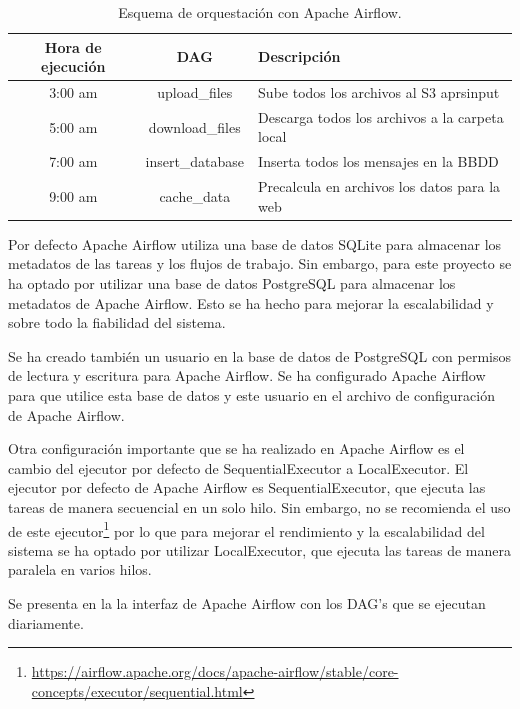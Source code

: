 \begin{table}[htbp]
	\centering
	\begin{tabular}{|c|c|m{5.5cm}|}
		\hline
		\textbf{Hora de ejecución} & \textbf{DAG}     & \textbf{Descripción}                           \\
		\hline
		3:00 am                    & upload\_files    & Sube todos los archivos al S3 aprsinput        \\
		\hline
		5:00 am                    & download\_files  & Descarga todos los archivos a la carpeta local \\
		\hline
		7:00 am                    & insert\_database & Inserta todos los mensajes en la BBDD          \\
		\hline
		9:00 am                    & cache\_data      & Precalcula en archivos los datos para la web   \\
		\hline
	\end{tabular}
	\caption{Esquema de orquestación con Apache Airflow.}
	\label{tab:airflow-sched}
\end{table}

Por defecto Apache Airflow utiliza una base de datos SQLite para almacenar los metadatos de las tareas y los flujos de trabajo. Sin embargo, para este proyecto se ha optado por utilizar una base de datos PostgreSQL para almacenar los metadatos de Apache Airflow. Esto se ha hecho para mejorar la escalabilidad y sobre todo la fiabilidad del sistema.

Se ha creado también un usuario en la base de datos de PostgreSQL con permisos de lectura y escritura para Apache Airflow. Se ha configurado Apache Airflow para que utilice esta base de datos y este usuario en el archivo de configuración de Apache Airflow.

Otra configuración importante que se ha realizado en Apache Airflow es el cambio del ejecutor por defecto de SequentialExecutor a LocalExecutor. El ejecutor por defecto de Apache Airflow es SequentialExecutor, que ejecuta las tareas de manera secuencial en un solo hilo. Sin embargo, no se recomienda el uso de este ejecutor\footnote{\url{https://airflow.apache.org/docs/apache-airflow/stable/core-concepts/executor/sequential.html}} por lo que para mejorar el rendimiento y la escalabilidad del sistema se ha optado por utilizar LocalExecutor, que ejecuta las tareas de manera paralela en varios hilos.

Se presenta en la  la interfaz de Apache Airflow con los DAG's que se ejecutan diariamente.

